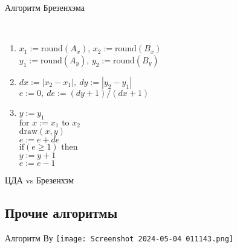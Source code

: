 \documentclass[10pt]{beamer}
\begin{document}
	\begin{frame}{Алгоритм Брезенхэма}
		{
		}
		{
			\small
			\begin{center}
			\end{center} ~\\[-3em]
			
			\begin{enumerate}
				\item<+-> 	$x_1:=\text{round}(A_x)$, $x_2:=\text{round}(B_x)$\\				
						$y_1:=\text{round}(A_y)$, $y_2:=\text{round}(B_y)$\\
						
				\item<+->  	$dx:=|x_2-x_1|, \ dy:=|y_2-y_1|$\\	
						$e:=0, \ de:=(dy+1)/(dx+1) $
						
						
				\item<+->  	$y:=y_1$\\
						$\text{for }x:=x_1\text{ to }x_2$\\
						\quad$\text{draw}(x,y)$\\
						\quad$e:=e+de$\\
						\quad $\text{if}(e \geq 1)\text{ then}$\\
						\quad\quad$y:=y+1$\\
						\quad\quad$e:=e-1$ 
			\end{enumerate}
		}
	\end{frame}
	
	\begin{frame}{ЦДА vs Брезенхэм}
		\centering
		
	\end{frame}
	
	\subsection{Прочие алгоритмы}
	
	\begin{frame}{Алгоритм Ву}
		\texttt{[image: Screenshot 2024-05-04 011143.png]}
	\end{frame}

\begin{comment}
\end{comment}
\end{document}
